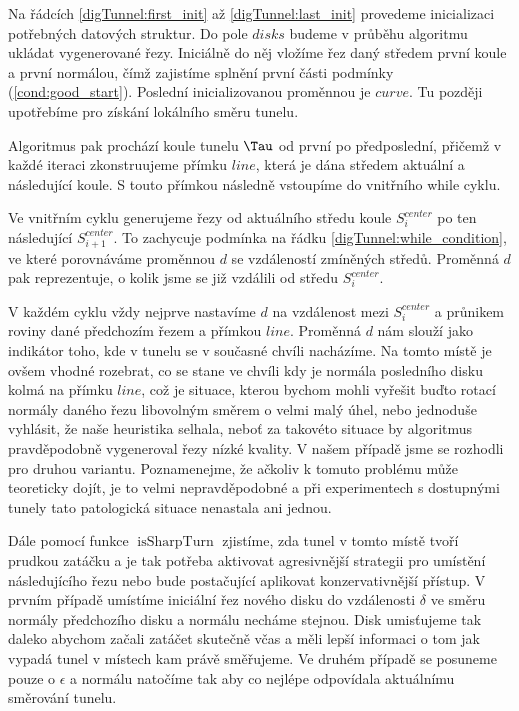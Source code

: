 Na řádcích \ref{digTunnel:first_init} až \ref{digTunnel:last_init} provedeme
inicializaci potřebných datových struktur. Do pole $ disks $ budeme
v průběhu algoritmu ukládat vygenerované řezy. Iniciálně do něj vložíme
řez daný středem první koule a první normálou, čímž zajistíme splnění první
části podmínky (\ref{cond:good_start}). Poslední inicializovanou proměnnou je
$ curve $. Tu později upotřebíme pro získání lokálního směru tunelu.

Algoritmus pak prochází koule tunelu $ \Tau $ od první po předposlední, přičemž
v každé iteraci zkonstruujeme přímku $ line $, která je dána středem aktuální
a následující koule. S touto přímkou následně vstoupíme do vnitřního while cyklu.

Ve vnitřním cyklu generujeme řezy od aktuálního středu koule $ S_{i}^{center} $
po ten následující $ S_{i + 1}^{center} $. To zachycuje podmínka
na řádku \ref{digTunnel:while_condition}, ve které porovnáváme
proměnnou $ d $ se vzdáleností zmíněných středů. Proměnná $ d $ pak reprezentuje,
o kolik jsme se již vzdálili od středu $ S_{i}^{center} $.

V každém cyklu vždy nejprve nastavíme $ d $ na vzdálenost mezi $ S_{i}^{center} $ a
průnikem roviny dané předchozím řezem a přímkou $ line $. Proměnná $ d $ nám
slouží jako indikátor toho, kde v tunelu se v současné chvíli nacházíme.
Na tomto místě je ovšem vhodné rozebrat, co se stane ve chvíli kdy je normála
posledního disku kolmá na přímku $ line $, což je situace, kterou bychom mohli
vyřešit buďto rotací normály daného řezu libovolným směrem o velmi malý úhel,
nebo jednoduše vyhlásit, že naše heuristika selhala, neboť za
takovéto situace by algoritmus pravděpodobně vygeneroval řezy nízké kvality.
V našem případě jsme se rozhodli pro druhou variantu.
Poznamenejme, že ačkoliv k tomuto problému může teoreticky dojít, je to
velmi nepravděpodobné a při experimentech s dostupnými tunely tato patologická
situace nenastala ani jednou.

Dále pomocí funkce $ \operatorname{isSharpTurn} $ zjistíme, zda tunel v tomto
místě tvoří prudkou zatáčku a je tak potřeba aktivovat agresivnější strategii pro
umístění následujícího řezu nebo bude postačující aplikovat konzervativnější
přístup. V prvním případě umístíme iniciální řez nového disku do vzdálenosti
$ \delta $ ve směru normály předchozího disku a normálu necháme stejnou. Disk
umisťujeme tak daleko abychom začali zatáčet skutečně včas a měli lepší
informaci o tom jak vypadá tunel v místech kam právě směřujeme. Ve druhém případě
se posuneme pouze o $ \epsilon $ a normálu natočíme tak aby co nejlépe odpovídala
aktuálnímu směrování tunelu.

